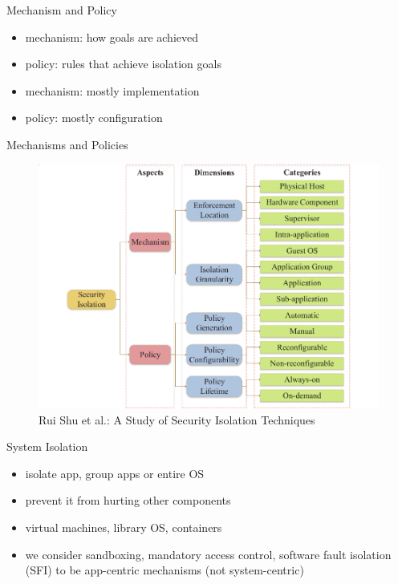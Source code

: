 \documentclass{curs}
\begin{document}
\begin{frame}{Mechanism and Policy}
  \begin{itemize}
    \item mechanism: how goals are achieved
    \item policy: rules that achieve isolation goals
    \item mechanism: mostly implementation
    \item policy: mostly configuration
  \end{itemize}
\end{frame}

\begin{frame}{Mechanisms and Policies}
  \begin{figure}
    \centering
    \includegraphics[width=\textwidth]{img/isolation-mechanism-policy} \\
    {\tiny Rui Shu et al.: A Study of Security Isolation Techniques}
  \end{figure}
\end{frame}

\begin{frame}{System Isolation}
  \begin{itemize}
    \item isolate app, group apps or entire OS
    \item prevent it from hurting other components
    \item virtual machines, library OS, containers
    \item we consider sandboxing, mandatory access control, software fault isolation (SFI) to be app-centric mechanisms (not system-centric)
  \end{itemize}
\end{frame}
\end{document}
